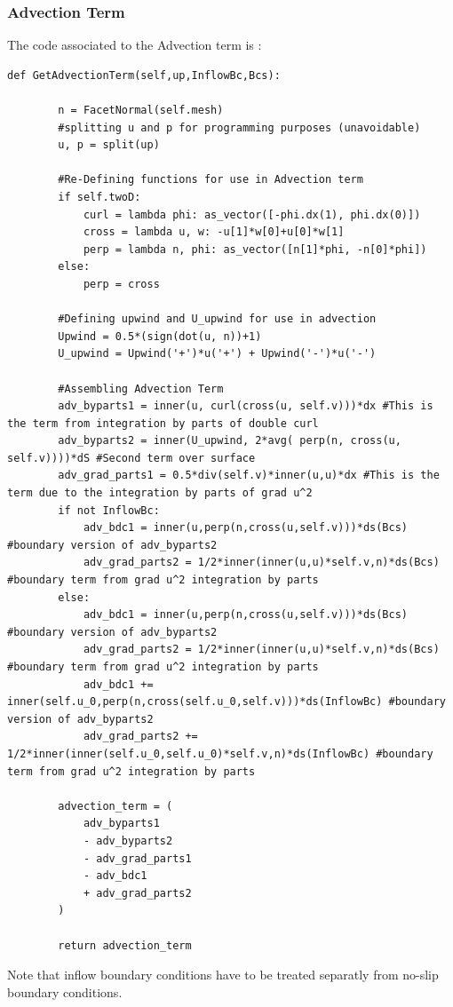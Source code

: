 \documentclass[11pt,twoside,a4paper]{article}
\begin{document}
\subsubsection{Advection Term}
The code associated to the Advection term is :
\begin{lstlisting}
def GetAdvectionTerm(self,up,InflowBc,Bcs):

        n = FacetNormal(self.mesh)
        #splitting u and p for programming purposes (unavoidable)
        u, p = split(up)

        #Re-Defining functions for use in Advection term
        if self.twoD:
            curl = lambda phi: as_vector([-phi.dx(1), phi.dx(0)])
            cross = lambda u, w: -u[1]*w[0]+u[0]*w[1]
            perp = lambda n, phi: as_vector([n[1]*phi, -n[0]*phi])
        else:
            perp = cross

        #Defining upwind and U_upwind for use in advection
        Upwind = 0.5*(sign(dot(u, n))+1)
        U_upwind = Upwind('+')*u('+') + Upwind('-')*u('-')

        #Assembling Advection Term
        adv_byparts1 = inner(u, curl(cross(u, self.v)))*dx #This is the term from integration by parts of double curl
        adv_byparts2 = inner(U_upwind, 2*avg( perp(n, cross(u, self.v))))*dS #Second term over surface
        adv_grad_parts1 = 0.5*div(self.v)*inner(u,u)*dx #This is the term due to the integration by parts of grad u^2
        if not InflowBc:
            adv_bdc1 = inner(u,perp(n,cross(u,self.v)))*ds(Bcs) #boundary version of adv_byparts2
            adv_grad_parts2 = 1/2*inner(inner(u,u)*self.v,n)*ds(Bcs) #boundary term from grad u^2 integration by parts
        else:
            adv_bdc1 = inner(u,perp(n,cross(u,self.v)))*ds(Bcs) #boundary version of adv_byparts2
            adv_grad_parts2 = 1/2*inner(inner(u,u)*self.v,n)*ds(Bcs) #boundary term from grad u^2 integration by parts
            adv_bdc1 +=  inner(self.u_0,perp(n,cross(self.u_0,self.v)))*ds(InflowBc) #boundary version of adv_byparts2
            adv_grad_parts2 += 1/2*inner(inner(self.u_0,self.u_0)*self.v,n)*ds(InflowBc) #boundary term from grad u^2 integration by parts

        advection_term = (
            adv_byparts1
            - adv_byparts2
            - adv_grad_parts1
            - adv_bdc1
            + adv_grad_parts2
        )

        return advection_term
\end{lstlisting}
Note that inflow boundary conditions have to be treated separatly from no-slip boundary conditions.
\end{document}
